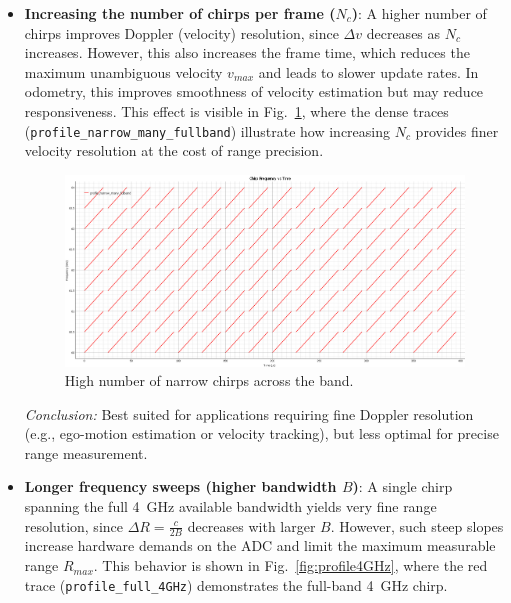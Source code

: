 \begin{itemize}
    \item \textbf{Increasing the number of chirps per frame ($N_c$)}:  
    A higher number of chirps improves Doppler (velocity) resolution, since $\Delta v$ decreases as $N_c$ increases.  
    However, this also increases the frame time, which reduces the maximum unambiguous velocity $v_{max}$ and leads to slower update rates.  
    In odometry, this improves smoothness of velocity estimation but may reduce responsiveness.  
    This effect is visible in Fig.~\ref{fig:profile_narrow_many_fullband}, where the dense traces (\texttt{profile\_narrow\_many\_fullband}) illustrate how increasing $N_c$ provides finer velocity resolution at the cost of range precision.  

    \begin{figure}[!htbp]
        \centering
        \includegraphics[width=1.0\linewidth]{images/profile_narrow_many_fullband.png}
        \caption{High number of narrow chirps across the band.}
        \label{fig:profile_narrow_many_fullband}
    \end{figure}

    {\small
    \textit{Conclusion:}  
    Best suited for applications requiring fine Doppler resolution (e.g., ego-motion estimation or velocity tracking), but less optimal for precise range measurement.
    }

    \vspace{1em} 
    \item \textbf{Longer frequency sweeps (higher bandwidth $B$)}:  
    A single chirp spanning the full 4~GHz available bandwidth yields very fine range resolution, since $\Delta R = \tfrac{c}{2B}$ decreases with larger $B$.  
    However, such steep slopes increase hardware demands on the ADC and limit the maximum measurable range $R_{max}$.  
    This behavior is shown in Fig.~\ref{fig:profile4GHz}, where the red trace (\texttt{profile\_full\_4GHz}) demonstrates the full-band 4~GHz chirp.  


\end{itemize}
